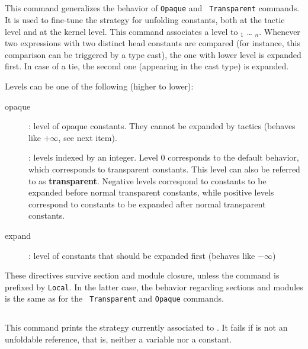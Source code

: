 \subsection{{}\label{Strategy}}
This command generalizes the behavior of {\tt Opaque} and {\tt
  Transparent} commands. It is used to fine-tune the strategy for
unfolding constants, both at the tactic level and at the kernel
level. This command associates a level to \qualid$_1$ {\ldots}
\qualid$_n$. Whenever two expressions with two distinct head
constants are compared (for instance, this comparison can be triggered
by a type cast), the one with lower level is expanded first. In case
of a tie, the second one (appearing in the cast type) is expanded.

Levels can be one of the following (higher to lower):
\begin{description}
\item[opaque]: level of opaque constants. They cannot be expanded by
  tactics (behaves like $+\infty$, see next item).
\item[\num]: levels indexed by an integer. Level $0$ corresponds
  to the default behavior, which corresponds to transparent
  constants. This level can also be referred to as {\bf transparent}.
  Negative levels correspond to constants to be expanded before normal
  transparent constants, while positive levels correspond to constants
  to be expanded after normal transparent constants.
\item[expand]: level of constants that should be expanded first
  (behaves like $-\infty$)
\end{description}

These directives survive section and module closure, unless the
command is prefixed by {\tt Local}. In the latter case, the behavior
regarding sections and modules is the same as for the {\tt
  Transparent} and {\tt Opaque} commands.

\subsection{{}\label{PrintStrategy}}

This command prints the strategy currently associated to \qualid{}. It fails if
\qualid{} is not an unfoldable reference, that is, neither a variable nor a
constant.

